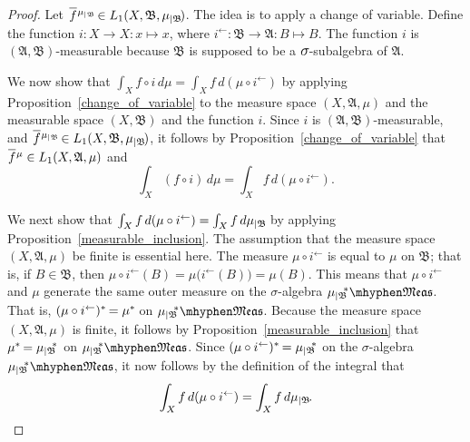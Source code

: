 \documentclass[
twoside=true,
paper=letter,
fontsize=9pt,
pagesize=auto,
leqno,
openany,
headsepline,
overfullrule,
]{scrbook}
\theoremstyle{plain}
\theoremstyle{plain}
\theoremstyle{definition}
\theoremstyle{bfnoteitalic}
\theoremstyle{bfnoteroman}
\newcommand{\sigalg}[1]{\mathfrak{#1}}
\newcommand{\textsigma}{\hbox{\large{$\sigma$}}\kern-1pt}
\newcommand{\restrictedto}[1]{_{\lvert#1}\kern-1.5pt}
\newcommand{\preimage}[1]{#1^{\leftarrow}}
\newcommand{\sigmaalgebra}{\sigalg{A}}
\newcommand{\sigmaalgebraii}{\sigalg{B}}
\newcommand{\measurable}[1]{{#1}\mhyphen\mathfrak{Meas}}
\newcommand{\kernast}{\ast\kern-1pt}
\newcommand{\measuresubstar}[1]{\measure\restrictedto{#1}\kern-2pt^*}
\newcommand{\measurespace}{X}
\newcommand{\mspaceelt}{x}
\newcommand{\measure}{\mu}
\newcommand*\xbar[1]{%
   \hbox{%
     \vbox{%
       \hrule height 0.4pt %
       \kern0.4ex%
       \hbox{%
         \ensuremath{#1}%
       }%
     }%
   }%
}
\newcommand{\lebclass}[1]{\hspace{.5pt}\xbar{#1}\hspace{0.5pt}}
\newcommand{\ellclass}[2]{\lebclass{#1}^{#2}}
\begin{document}
\begin{proof}
Let $\ellclass{f}{\measure\restrictedto{\sigmaalgebraii}}
\in L_1(\measurespace, \sigmaalgebraii, \measure\restrictedto{\sigmaalgebraii})$.
The idea is to apply a change of variable.
Define the function $i:\measurespace\to\measurespace:\mspaceelt\mapsto\mspaceelt$, where 
$\preimage{i}:\sigmaalgebraii\to\sigmaalgebra:B\mapsto B$.
The function 
$i$ is
$(\sigmaalgebra, \sigmaalgebraii)$\hyp{}measurable because $\sigmaalgebraii$ is supposed to be a 
$\textsigma$-subalgebra of $\sigmaalgebra$.



We now show that $\int_\measurespace f\circ i \, d\measure
= \int_\measurespace f \, d(\measure\circ\preimage i)$
by applying Proposition~\ref{change_of_variable} to the measure space $(\measurespace, \sigmaalgebra, \measure)$ and the measurable space $(\measurespace, \sigmaalgebraii)$ and the function $i$. 
Since $i$ is
$(\sigmaalgebra, \sigmaalgebraii)$\hyp{}measurable, and
$\ellclass{f}{\measure\restrictedto{\sigmaalgebraii}}
\in L_1(\measurespace, \sigmaalgebraii, \measure\restrictedto{\sigmaalgebraii})
$,
it follows by Proposition~\ref{change_of_variable} that 
$\ellclass{f}{\measure}
\in L_1(\measurespace, \sigmaalgebra, \measure)$ and
\[
\int_\measurespace (f\circ i) \, d\measure
= \int_\measurespace f \, d(\measure\circ\preimage i).
\]



We next show that 
$\int_\measurespace f \, d(\measure\circ\preimage{i})
= \int_\measurespace f \, d \measure\restrictedto{\sigmaalgebraii}$ 
by applying Proposition~\ref{measurable_inclusion}.
The assumption that the measure space $(\measurespace, \sigmaalgebra, \measure)$ be finite is essential here.
The measure $\measure\circ\preimage i$ is equal to $\measure$ on $\sigmaalgebraii$; that is, if $B\in\sigmaalgebraii$, then $\measure\circ\preimage i(B) = \measure\bigl(\preimage{i}(B)\bigr) = \measure(B)$.  
This means that $\measure\circ\preimage i$ and $\measure$ generate the same outer measure on the \textsigma-algebra
$\measurable{\measuresubstar{\sigmaalgebraii}}$. That is, $(\measure\circ\preimage i)^\kernast = \measure^\kernast$
on $\measurable{\measuresubstar{\sigmaalgebraii}}$.
Because the measure space 
$(\measurespace, \sigmaalgebra, \measure)$ is finite, it follows by Proposition~\ref{measurable_inclusion} that 
$\measure^\kernast = \measuresubstar{\sigmaalgebraii}$ on $\measurable{\measuresubstar{\sigmaalgebraii}}$.
Since 
$(\measure\circ\preimage i)^\kernast = \measuresubstar{\sigmaalgebraii}$ on the \textsigma-algebra $\measurable{\measuresubstar{\sigmaalgebraii}}$,
it now follows by the definition of the integral that 
\[
\int_\measurespace f \, d(\measure\circ\preimage{i})
= \int_\measurespace f \, d \measure\restrictedto{\sigmaalgebraii}.
\]




\end{proof}
\end{document}
